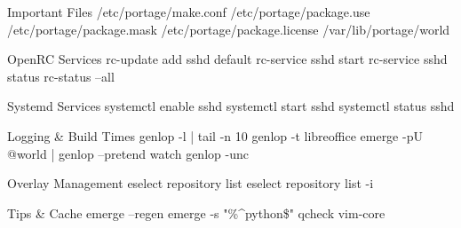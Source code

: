 \documentclass[10pt]{article}
\begin{document}
\begin{multicols}{2}
\begin{cheatbox}{Important Files}
/etc/portage/make.conf
/etc/portage/package.use
/etc/portage/package.mask
/etc/portage/package.license
/var/lib/portage/world
\end{cheatbox}

\begin{cheatbox}{OpenRC Services}
rc-update add sshd default
rc-service sshd start
rc-service sshd status
rc-status --all
\end{cheatbox}

\begin{cheatbox}{Systemd Services}
systemctl enable sshd
systemctl start sshd
systemctl status sshd
\end{cheatbox}

\begin{cheatbox}{Logging \& Build Times}
genlop -l | tail -n 10
genlop -t libreoffice
emerge -pU @world | genlop --pretend
watch genlop -unc
\end{cheatbox}

\begin{cheatbox}{Overlay Management}
eselect repository list
eselect repository list -i
\end{cheatbox}

\begin{cheatbox}{Tips \& Cache}
emerge --regen
emerge -s "\%^python\$"
qcheck vim-core
\end{cheatbox}

\end{multicols}
\end{document}
